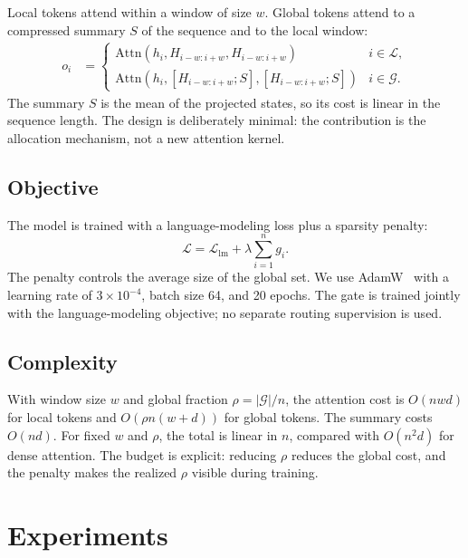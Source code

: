 \documentclass[10pt]{article}
\begin{document}
Local tokens attend within a window of size $w$. Global tokens attend to a compressed summary $S$ of the sequence and to the local window:
\begin{align}
  o_i &=
  \begin{cases}
    \mathrm{Attn}(h_i, H_{i-w:i+w}, H_{i-w:i+w}) & i \in \mathcal{L}, \\
    \mathrm{Attn}(h_i, [H_{i-w:i+w}; S], [H_{i-w:i+w}; S]) & i \in \mathcal{G}.
  \end{cases}
  \label{eq:attention}
\end{align}
The summary $S$ is the mean of the projected states, so its cost is linear in the sequence length. The design is deliberately minimal: the contribution is the allocation mechanism, not a new attention kernel.

\subsection{Objective}
\label{sec:objective}
The model is trained with a language-modeling loss plus a sparsity penalty:
\begin{equation}
  \mathcal{L} = \mathcal{L}_{\mathrm{lm}} + \lambda \sum_{i=1}^{n} g_i .
  \label{eq:loss}
\end{equation}
The penalty controls the average size of the global set. We use AdamW~\cite{Loshchilov2019Decoupled} with a learning rate of $3\times10^{-4}$, batch size 64, and 20 epochs. The gate is trained jointly with the language-modeling objective; no separate routing supervision is used.

\subsection{Complexity}
\label{sec:complexity}
With window size $w$ and global fraction $\rho = |\mathcal{G}|/n$, the attention cost is $O(n w d)$ for local tokens and $O(\rho n (w + d))$ for global tokens. The summary costs $O(nd)$. For fixed $w$ and $\rho$, the total is linear in $n$, compared with $O(n^2 d)$ for dense attention. The budget is explicit: reducing $\rho$ reduces the global cost, and the penalty makes the realized $\rho$ visible during training.

\section{Experiments}
\label{sec:experiments}
\end{document}
